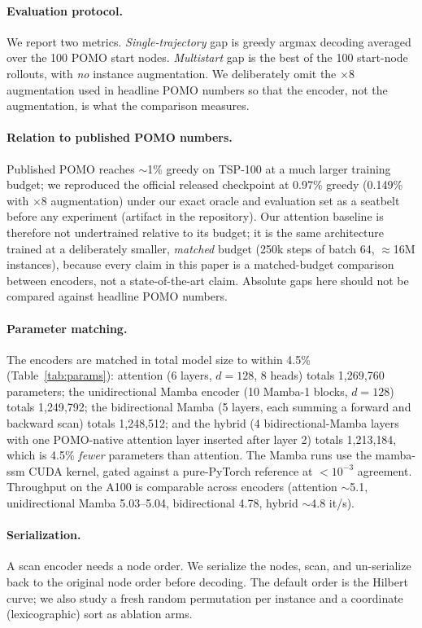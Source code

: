 \documentclass[11pt]{article}
\newcommand{\pct}{\%}
\begin{document}
\paragraph{Evaluation protocol.}
We report two metrics. \emph{Single-trajectory} gap is greedy argmax decoding
averaged over the 100 POMO start nodes. \emph{Multistart} gap is the best of the
100 start-node rollouts, with \emph{no} instance augmentation. We deliberately
omit the $\times$8 augmentation used in headline POMO numbers so that the
encoder, not the augmentation, is what the comparison measures.

\paragraph{Relation to published POMO numbers.}
Published POMO reaches $\sim$1\pct{} greedy on TSP-100 at a much larger training
budget; we reproduced the official released checkpoint at 0.97\pct{} greedy
(0.149\pct{} with $\times$8 augmentation) under our exact oracle and evaluation
set as a seatbelt before any experiment (artifact in the repository). Our
attention baseline is therefore not undertrained relative to its budget; it is
the same architecture trained at a deliberately smaller, \emph{matched} budget
(250k steps of batch 64, $\approx$16M instances), because every claim in this
paper is a matched-budget comparison between encoders, not a state-of-the-art
claim. Absolute gaps here should not be compared against headline POMO numbers.

\paragraph{Parameter matching.}
The encoders are matched in total model size to within 4.5\pct{}
(Table~\ref{tab:params}): attention
(6 layers, $d=128$, 8 heads) totals 1{,}269{,}760 parameters; the unidirectional
Mamba encoder (10 Mamba-1 blocks, $d=128$) totals 1{,}249{,}792; the
bidirectional Mamba (5 layers, each summing a forward and backward scan) totals
1{,}248{,}512; and the hybrid (4 bidirectional-Mamba layers with one POMO-native
attention layer inserted after layer 2) totals 1{,}213{,}184, which is 4.5\pct{}
\emph{fewer} parameters than attention. The Mamba runs use the mamba-ssm CUDA
kernel, gated against a pure-PyTorch reference at $<10^{-3}$ agreement.
Throughput on the A100 is comparable across encoders (attention $\sim$5.1,
unidirectional Mamba 5.03--5.04, bidirectional 4.78, hybrid $\sim$4.8 it/s).

\paragraph{Serialization.}
A scan encoder needs a node order. We serialize the nodes, scan, and
un-serialize back to the original node order before decoding. The default order
is the Hilbert curve; we also study a fresh random permutation per instance and a
coordinate (lexicographic) sort as ablation arms.
\end{document}
